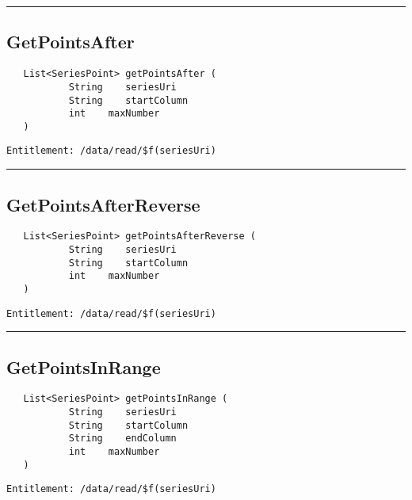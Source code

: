 \rule{12cm}{2pt}
\subsection{GetPointsAfter}
\label{Api:GetPointsAfter}
\begin{verbatim}
   List<SeriesPoint> getPointsAfter (
           String    seriesUri
           String    startColumn
           int    maxNumber
   )
\end{verbatim}
\begin{Verbatim}[fontsize=\small, formatcom=\color{Maroon}]
  Entitlement: /data/read/$f(seriesUri)
\end{Verbatim}



\rule{12cm}{2pt}
\subsection{GetPointsAfterReverse}
\label{Api:GetPointsAfterReverse}
\begin{verbatim}
   List<SeriesPoint> getPointsAfterReverse (
           String    seriesUri
           String    startColumn
           int    maxNumber
   )
\end{verbatim}
\begin{Verbatim}[fontsize=\small, formatcom=\color{Maroon}]
  Entitlement: /data/read/$f(seriesUri)
\end{Verbatim}



\rule{12cm}{2pt}
\subsection{GetPointsInRange}
\label{Api:GetPointsInRange}
\begin{verbatim}
   List<SeriesPoint> getPointsInRange (
           String    seriesUri
           String    startColumn
           String    endColumn
           int    maxNumber
   )
\end{verbatim}
\begin{Verbatim}[fontsize=\small, formatcom=\color{Maroon}]
  Entitlement: /data/read/$f(seriesUri)
\end{Verbatim}



